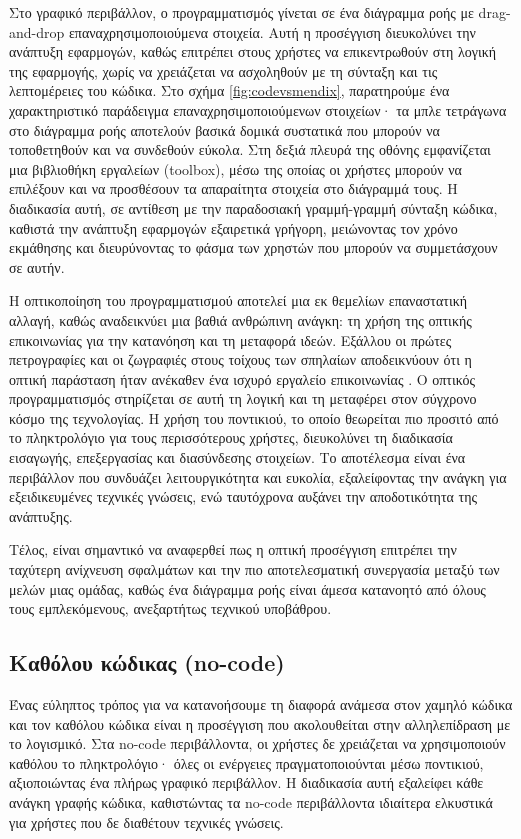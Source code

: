                 Στο γραφικό περιβάλλον, ο προγραμματισμός γίνεται σε ένα διάγραμμα ροής με drag-and-drop επαναχρησιμοποιούμενα στοιχεία. Αυτή η προσέγγιση διευκολύνει την ανάπτυξη εφαρμογών, καθώς επιτρέπει στους χρήστες να επικεντρωθούν στη λογική της εφαρμογής, χωρίς να χρειάζεται να ασχοληθούν με τη σύνταξη και τις λεπτομέρειες του κώδικα. Στο σχήμα \ref{fig:codevsmendix}, παρατηρούμε ένα χαρακτηριστικό παράδειγμα επαναχρησιμοποιούμενων στοιχείων· τα μπλε τετράγωνα στο διάγραμμα ροής αποτελούν βασικά δομικά συστατικά που μπορούν να τοποθετηθούν και να συνδεθούν εύκολα. Στη δεξιά πλευρά της οθόνης εμφανίζεται μια βιβλιοθήκη εργαλείων (toolbox), μέσω της οποίας οι χρήστες μπορούν να επιλέξουν και να προσθέσουν τα απαραίτητα στοιχεία στο διάγραμμά τους. Η διαδικασία αυτή, σε αντίθεση με την παραδοσιακή γραμμή-γραμμή σύνταξη κώδικα, καθιστά την ανάπτυξη εφαρμογών εξαιρετικά γρήγορη, μειώνοντας τον χρόνο εκμάθησης και διευρύνοντας το φάσμα των χρηστών που μπορούν να συμμετάσχουν σε αυτήν.

                Η οπτικοποίηση του προγραμματισμού αποτελεί μια εκ θεμελίων επαναστατική αλλαγή, καθώς αναδεικνύει μια βαθιά ανθρώπινη ανάγκη: τη χρήση της οπτικής επικοινωνίας για την κατανόηση και τη μεταφορά ιδεών. Εξάλλου οι πρώτες πετρογραφίες και οι ζωγραφιές στους τοίχους των σπηλαίων αποδεικνύουν ότι η οπτική παράσταση ήταν ανέκαθεν ένα ισχυρό εργαλείο επικοινωνίας \cite{CASEKuhn}. Ο οπτικός προγραμματισμός στηρίζεται σε αυτή τη λογική και τη μεταφέρει στον σύγχρονο κόσμο της τεχνολογίας. Η χρήση του ποντικιού, το οποίο θεωρείται πιο προσιτό από το πληκτρολόγιο για τους περισσότερους χρήστες, διευκολύνει τη διαδικασία εισαγωγής, επεξεργασίας και διασύνδεσης στοιχείων. Το αποτέλεσμα είναι ένα περιβάλλον που συνδυάζει λειτουργικότητα και ευκολία, εξαλείφοντας την ανάγκη για εξειδικευμένες τεχνικές γνώσεις, ενώ ταυτόχρονα αυξάνει την αποδοτικότητα της ανάπτυξης.

                Τέλος, είναι σημαντικό να αναφερθεί πως η οπτική προσέγγιση επιτρέπει την ταχύτερη ανίχνευση σφαλμάτων και την πιο αποτελεσματική συνεργασία μεταξύ των μελών μιας ομάδας, καθώς ένα διάγραμμα ροής είναι άμεσα κατανοητό από όλους τους εμπλεκόμενους, ανεξαρτήτως τεχνικού υποβάθρου.

            \subsection{Καθόλου κώδικας (no-code)}
                Ένας εύληπτος τρόπος για να κατανοήσουμε τη διαφορά ανάμεσα στον χαμηλό κώδικα και τον καθόλου κώδικα είναι η προσέγγιση που ακολουθείται στην αλληλεπίδραση με το λογισμικό. Στα no-code περιβάλλοντα, οι χρήστες δε χρειάζεται να χρησιμοποιούν καθόλου το πληκτρολόγιο· όλες οι ενέργειες πραγματοποιούνται μέσω ποντικιού, αξιοποιώντας ένα πλήρως γραφικό περιβάλλον. Η διαδικασία αυτή εξαλείφει κάθε ανάγκη γραφής κώδικα, καθιστώντας τα no-code περιβάλλοντα ιδιαίτερα ελκυστικά για χρήστες που δε διαθέτουν τεχνικές γνώσεις.

